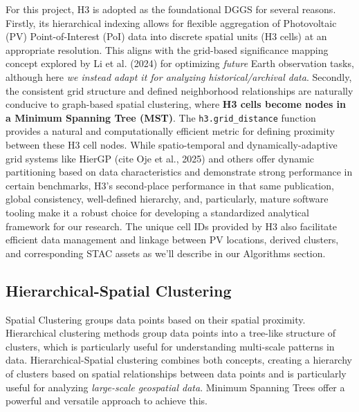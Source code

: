 \begin{multicols}{2}
For this project, H3 is adopted as the foundational DGGS for several reasons. Firstly, its hierarchical indexing allows for flexible aggregation of Photovoltaic (PV) Point-of-Interest (PoI) data into discrete spatial units (H3 cells) at an appropriate resolution. 
This aligns with the grid-based significance mapping concept explored by Li et al. (2024) for optimizing \textit{future} Earth observation tasks\cite{Li_H3_EO_planning_2024}, although here \textit{we instead adapt it for analyzing historical/archival data}. 
Secondly, the consistent grid structure and defined neighborhood relationships are naturally conducive to graph-based spatial clustering, where \textbf{H3 cells become nodes in a Minimum Spanning Tree (MST)}. 
The \texttt{h3.grid\_distance} function provides a natural and computationally efficient metric for defining proximity between these H3 cell nodes. 
While spatio-temporal and dynamically-adaptive grid systems like HierGP (cite Oje et al., 2025) \cite{Oje_HierGP_ST_2025} and others offer dynamic partitioning based on data characteristics and demonstrate strong performance in certain benchmarks, H3's 
second-place performance in that same publication, global consistency, well-defined hierarchy, and, particularly, mature software tooling make it a robust choice for developing a standardized analytical framework for our research. 
The unique cell IDs provided by H3 also facilitate efficient data management and linkage between PV locations, derived clusters, and corresponding STAC assets as we'll describe in our Algorithms section.

\subsection{Hierarchical-Spatial Clustering}
Spatial Clustering groups data points based on their spatial proximity. 
Hierarchical clustering methods group data points into a tree-like structure of clusters, which is particularly useful for understanding multi-scale patterns in data. 
Hierarchical-Spatial clustering combines both concepts, creating a hierarchy of clusters based on spatial relationships between data points and is particularly useful for analyzing \textit{large-scale geospatial data}.
Minimum Spanning Trees offer a powerful and versatile approach to achieve this.


\end{multicols}
